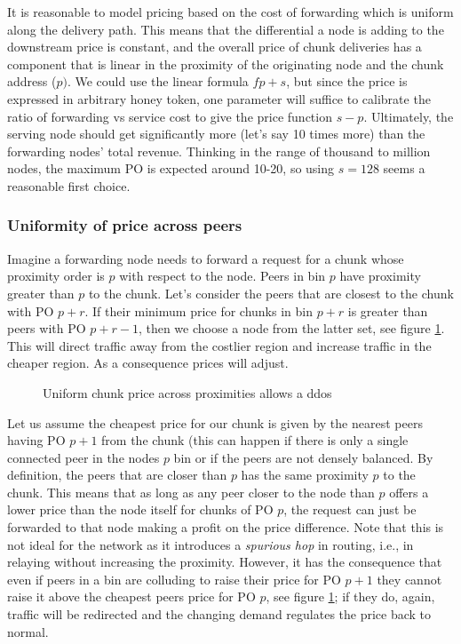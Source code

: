 It is reasonable to model pricing based on the cost of forwarding which is uniform along the delivery path. This means that the differential a node is adding to the downstream price is constant, and the overall price of chunk deliveries has a component that is linear in the proximity of the originating node and the chunk address ($p)$. We could use the linear formula $fp+s$, but since the price is expressed in arbitrary honey token, one parameter will suffice to calibrate the ratio of forwarding vs service cost to give the price  function $s-p$. Ultimately, the serving node should get significantly more (let's say 10 times more) than the forwarding nodes' total revenue. Thinking in the range of thousand to million nodes, the maximum PO is expected  around 10-20, so using $s=128$ seems a reasonable first choice. 

\subsubsection{Uniformity of price across peers}

Imagine a forwarding node needs to forward a request for a chunk whose proximity order is $p$ with respect to the node. 
Peers in bin $p$ have proximity greater than $p$ to the chunk. Let's consider the peers that are closest to the chunk with PO $p+r$. If their minimum price for chunks in bin $p+r$ is greater than peers with PO $p+r-1$, then we choose a node from the latter set, see figure  \ref{fig:price-arbitrage}. This will direct traffic away from the costlier region and increase traffic in the cheaper region. As a consequence prices will adjust. 

\begin{figure}[htbp]
   \centering
   \caption{Uniform chunk price across proximities allows a ddos}
   \label{fig:price-arbitrage}
\end{figure}

Let us assume the cheapest price for our chunk is given by the nearest peers having PO $p+1$ from the chunk (this can happen if there is only a single connected peer in the nodes $p$ bin or if the peers are not densely balanced. By definition, the peers that are closer than $p$ has the same proximity $p$ to the chunk. This means that as long as any peer closer to the node than $p$ offers a lower price than the node itself for chunks of PO $p$, the request can just be forwarded to that node making a profit on the price  difference. Note that this is not ideal for the network as it introduces a \emph{spurious hop} in routing, i.e., in relaying without increasing the proximity. However, it has the consequence that even if peers in a bin are colluding to raise their  price for PO $p+1$ they cannot raise it above the cheapest peers price for PO $p$, see figure  \ref{fig:price-arbitrage}; if they do, again, traffic will be redirected and the changing demand regulates the price back to normal. 

